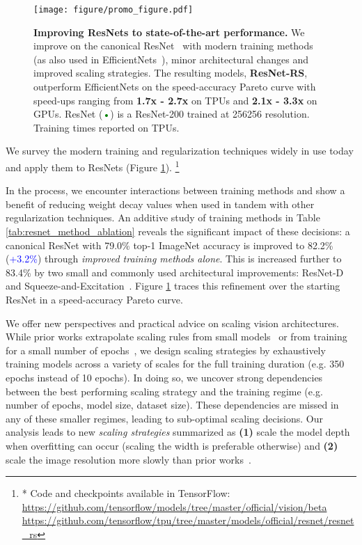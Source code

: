 \documentclass{article}
\newcommand\blfootnote[1]{\begingroup
  \renewcommand\thefootnote{}\footnote{#1}\addtocounter{footnote}{-1}\endgroup
}
\begin{document}
\begin{figure}[t!]
    \begin{center}
    \texttt{[image: figure/promo\_figure.pdf]}
    \end{center}
    \vspace{-0.3cm}
    \caption{\textbf{Improving ResNets to state-of-the-art performance.}
    We improve on the canonical ResNet~\cite{resnet} with modern training methods (as also used in EfficientNets~\cite{tan2019efficientnet}), minor architectural changes and improved scaling strategies.  
    The resulting models, \textbf{ResNet-RS}, outperform EfficientNets on the speed-accuracy Pareto curve with speed-ups ranging from \textbf{1.7x - 2.7x} on TPUs and \textbf{2.1x - 3.3x} on GPUs.
    ResNet (\textcolor{Green}{•}) is a ResNet-200 trained at 256256 resolution. 
    Training times reported on TPUs.
    }
    \label{fig:promo_figure}
    \vspace{-0.15cm}
\end{figure}

We survey the modern training and regularization techniques widely in use today and apply them to ResNets (Figure \ref{fig:promo_figure}).\blfootnote{* Code and checkpoints available in TensorFlow: \\\textcolor{magenta}{ \url{https://github.com/tensorflow/models/tree/master/official/vision/beta}} \\ \url{https://github.com/tensorflow/tpu/tree/master/models/official/resnet/resnet_rs}}{}
In the process, we encounter interactions between training methods and show a benefit of reducing weight decay values when used in tandem with other regularization techniques. 
An additive study of training methods in Table \ref{tab:resnet_method_ablation} reveals the significant impact of these decisions: a canonical ResNet with 79.0\% top-1 ImageNet accuracy is improved to 82.2\% (\textcolor{blue}{+3.2\%}) through \emph{improved training methods alone}.
This is increased further to 83.4\% by two small and commonly used architectural improvements: ResNet-D~\cite{he2019bag} and Squeeze-and-Excitation~\cite{hu2018squeeze}.
Figure \ref{fig:promo_figure} traces this refinement over the starting ResNet in a speed-accuracy Pareto curve.

We offer new perspectives and practical advice on scaling vision architectures.
While prior works extrapolate scaling rules from small models~\cite{tan2019efficientnet} or from training for a small number of epochs~\cite{radosavovic2020designing}, we design scaling strategies by exhaustively training models across a variety of scales for the full training duration (e.g. 350 epochs instead of 10 epochs).
In doing so, we uncover strong dependencies between the best performing scaling strategy and the training regime (e.g. number of epochs, model size, dataset size). 
These dependencies are missed in any of these smaller regimes, leading to sub-optimal scaling decisions.
Our analysis leads to new \emph{scaling strategies} summarized as \textbf{(1)} scale the model depth when overfitting can occur (scaling the width is preferable otherwise) and \textbf{(2)} scale the image resolution more slowly than prior works~\cite{tan2019efficientnet}.
\end{document}
